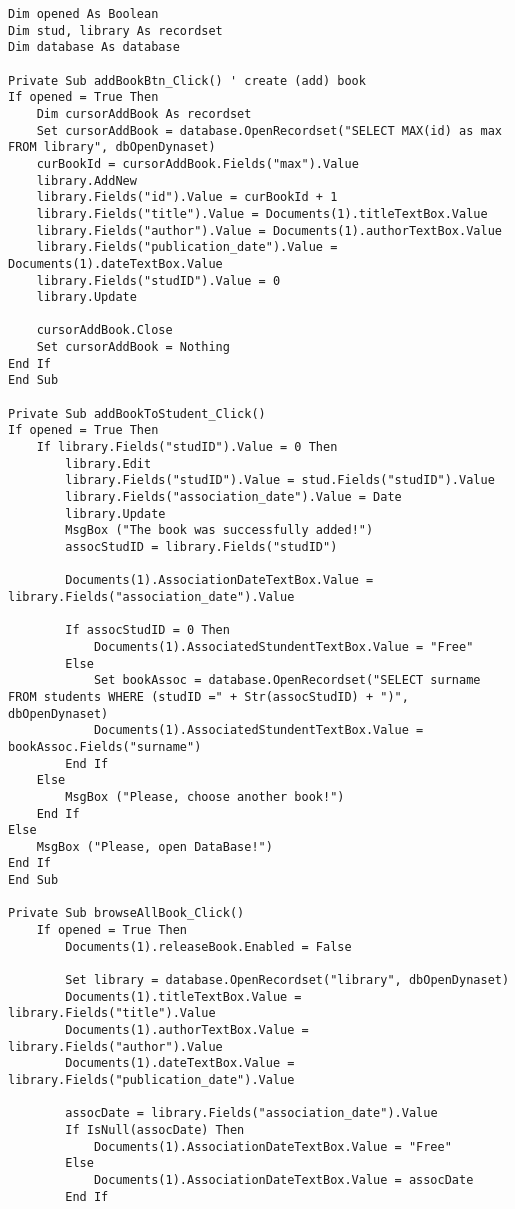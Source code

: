 \begin{lstlisting}[caption=VBA code]
Dim opened As Boolean
Dim stud, library As recordset
Dim database As database

Private Sub addBookBtn_Click() ' create (add) book
If opened = True Then
    Dim cursorAddBook As recordset
    Set cursorAddBook = database.OpenRecordset("SELECT MAX(id) as max FROM library", dbOpenDynaset)
    curBookId = cursorAddBook.Fields("max").Value
    library.AddNew
    library.Fields("id").Value = curBookId + 1
    library.Fields("title").Value = Documents(1).titleTextBox.Value
    library.Fields("author").Value = Documents(1).authorTextBox.Value
    library.Fields("publication_date").Value = Documents(1).dateTextBox.Value
    library.Fields("studID").Value = 0
    library.Update
    
    cursorAddBook.Close
    Set cursorAddBook = Nothing
End If
End Sub

Private Sub addBookToStudent_Click()
If opened = True Then
    If library.Fields("studID").Value = 0 Then
        library.Edit
        library.Fields("studID").Value = stud.Fields("studID").Value
        library.Fields("association_date").Value = Date
        library.Update
        MsgBox ("The book was successfully added!")
        assocStudID = library.Fields("studID")
            
        Documents(1).AssociationDateTextBox.Value = library.Fields("association_date").Value
                   
        If assocStudID = 0 Then
            Documents(1).AssociatedStundentTextBox.Value = "Free"
        Else
            Set bookAssoc = database.OpenRecordset("SELECT surname FROM students WHERE (studID =" + Str(assocStudID) + ")", dbOpenDynaset)
            Documents(1).AssociatedStundentTextBox.Value = bookAssoc.Fields("surname")
        End If
    Else
        MsgBox ("Please, choose another book!")
    End If
Else
    MsgBox ("Please, open DataBase!")
End If
End Sub

Private Sub browseAllBook_Click()
    If opened = True Then
        Documents(1).releaseBook.Enabled = False
    
        Set library = database.OpenRecordset("library", dbOpenDynaset)
        Documents(1).titleTextBox.Value = library.Fields("title").Value
        Documents(1).authorTextBox.Value = library.Fields("author").Value
        Documents(1).dateTextBox.Value = library.Fields("publication_date").Value
    
        assocDate = library.Fields("association_date").Value
        If IsNull(assocDate) Then
            Documents(1).AssociationDateTextBox.Value = "Free"
        Else
            Documents(1).AssociationDateTextBox.Value = assocDate
        End If
        

\end{lstlisting}

